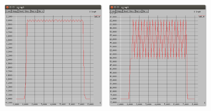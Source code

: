 \documentclass{article}
\begin{document}
\begin{enumerate}
\includegraphics[witdh=200,height=200]{xgraph0005.png} \ \includegraphics[witdh=200,height=200]{xgraph01.png}

\end{enumerate}
\end{document}

